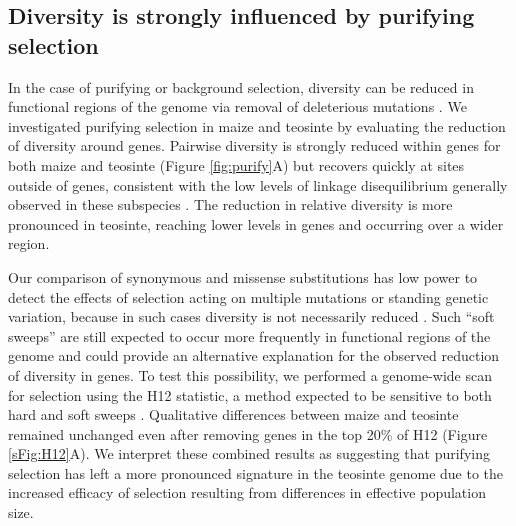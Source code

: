 \documentclass{pnastwo}
\newcommand{\mbh}[1]{\textcolor{blue}{\scriptsize #1}}
\begin{document}
\begin{article}
\subsection{Diversity is strongly influenced by purifying selection} %

In the case of purifying or background selection, diversity can be reduced in functional regions of the genome via removal of deleterious mutations \cite{charlesworth1993}.
We investigated purifying selection in maize and teosinte by evaluating the reduction of diversity around genes.
Pairwise diversity is strongly reduced within genes for both maize and teosinte (Figure \ref{fig:purify}A) but recovers quickly at sites outside of genes, consistent with the low levels of linkage disequilibrium generally observed in these subspecies \cite{tenaillon2002,chia2012}. 
The reduction in relative diversity is more pronounced in teosinte, reaching lower levels in genes and occurring over a wider region.  

Our comparison of synonymous and missense substitutions has low power to detect the effects of selection acting on multiple mutations or standing genetic variation, because in such cases diversity is not necessarily reduced \cite{innan2004,messer2013}. 
Such ``soft sweeps'' are still expected to occur more frequently in functional regions of the genome and could provide an alternative explanation for the observed reduction of diversity in genes. 
To test this possibility, we performed a genome-wide scan for selection using the H12 statistic, a method expected to be sensitive to both hard and soft sweeps \cite{garud2015}. 
Qualitative differences between maize and teosinte remained unchanged even after removing genes in the top 20\% of H12 (Figure \ref{sFig:H12}A).
We interpret these combined results as suggesting that purifying selection has left a more pronounced signature in the teosinte genome due to the increased efficacy of selection resulting from differences in effective population size.


\end{article}
\end{document}
